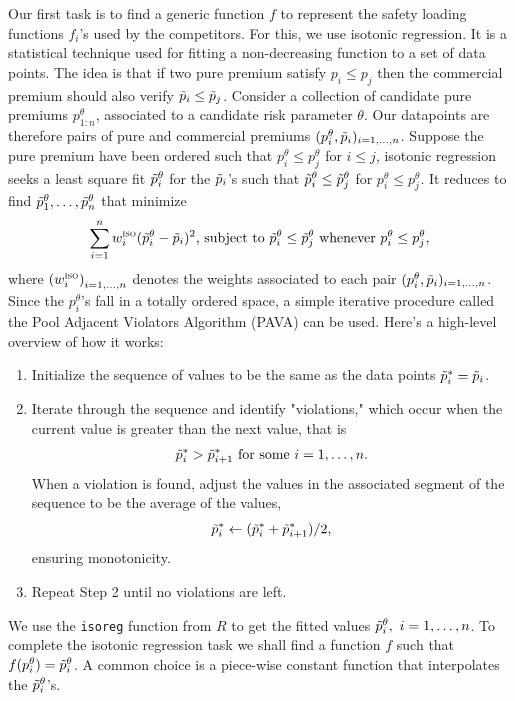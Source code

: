 \documentclass[10pt]{article}
\begin{document}
Our first task is to find a generic function $f$ to represent the safety loading functions $f_i$'s used by the competitors. For this, we use isotonic regression. It is a statistical technique used for fitting a non-decreasing function to a set of data points. The idea is that if two pure premium satisfy $p_i\leq p_j$ then the commercial premium should also verify $\Tilde{p}_i\leq \Tilde{p}_j$. Consider a collection of candidate pure premiums $p_{1:n}^\theta$, associated to a candidate risk parameter $\theta$. Our datapoints are therefore pairs of pure and commercial premiums $(p_i^\theta,\Tilde{p}_i)_{i=1,\ldots, n}$. Suppose the pure premium have been ordered such that $p_i^\theta\leq p_j^\theta$ for $i\leq j$, isotonic regression seeks a least square fit $\Tilde{p}^\theta_i$ for the $\Tilde{p}_i$'s such that $\Tilde{p}^\theta_i\leq \Tilde{p}^\theta_j$ for $p_i^\theta\leq p_j^\theta$. It reduces to find $\Tilde{p}^\theta_1,\ldots, \Tilde{p}^\theta_n$ that minimize
$$
\sum_{i=1}^nw_i^{\textsc{iso}}(\Tilde{p}^\theta_i- \Tilde{p}_i)^2\text{, subject to }\Tilde{p}_i^\theta\leq \Tilde{p}^\theta_j\text{ whenever }p_i^\theta\leq p_j^\theta,
$$
where $\left(w_i^{\textsc{iso}}\right)_{i = 1, \ldots, n}$ denotes the weights associated to each pair $(p_i^\theta,\Tilde{p}_i)_{i=1,\ldots, n}$. Since the $p_i^\theta$'s fall in a totally ordered space, a simple iterative procedure called the Pool Adjacent Violators Algorithm (PAVA) can be used. Here's a high-level overview of how it works:
\begin{enumerate}
\item Initialize the sequence of values to be the same as the data points $\Tilde{p}_i^\ast =\Tilde{p}_i$.

\item Iterate through the sequence and identify "violations," which occur when the current value is greater than the next value, that is 
$$
\Tilde{p}_i^\ast>\Tilde{p}_{i+1}^\ast\text{ for some }i=1,\ldots, n.
$$ 
When a violation is found, adjust the values in the associated segment of the sequence to be the average of the values,
$$
\Tilde{p}_i^\ast \leftarrow (\Tilde{p}_i^\ast + \Tilde{p}_{i+1}^\ast)/2,
$$ 
ensuring monotonicity.
\item Repeat Step 2 until no violations are left. 
\end{enumerate}
We use the \texttt{isoreg} function from $R$ to get the fitted values $\Tilde{p}^\theta_i,\text{ }i=1,\ldots, n$. To complete the isotonic regression task we shall find a function $f$ such that $f(p_i^\theta)=\Tilde{p}^\theta_i$. A common choice is a piece-wise constant function that interpolates the $\Tilde{p}^\theta_i$'s.\\
\end{document}
